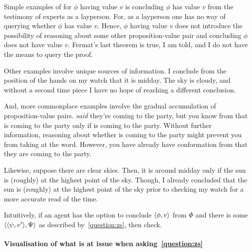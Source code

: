 \begin{note}[Success]
  Simple examples of \csV{} for \(\phi\) having value \(v\) is concluding \(\phi\) has value \(v\) from the testimony of experts as a layperson.
  For, as a layperson one has no way of querying whether \(\phi\) has value \(v\).
  Hence, \(\phi\) having value \(v\) does not introduce the possibility of reasoning about some other proposition-value pair and concluding \(\phi\) does not have value \(v\).
  Fermat's last theorem is true, I am told, and I do not have the means to query the proof.

  Other examples involve unique sources of information.
  I conclude from the position of the hands on my watch that it is midday.
  The sky is cloudy, and without a second time piece I have no hope of reaching a different conclusion.

  And, more commonplace examples involve the gradual accumulation of proposition-value pairs.
   \emph{said} they're coming to the party, but you know from  that  is coming to the party only if  is coming to the party.
  Without further information, reasoning about whether  is coming to the party might prevent you from taking  at the word.
  However, you have already have conformation from  that they are coming to the party.

  Likewise, suppose there are clear skies.
  Then, it is around midday only if the sun is (roughly) at the highest point of the sky.
  Though, I already concluded that the sun is (roughly) at the highest point of the sky prior to checking my watch for a more accurate read of the time.
\end{note}

\begin{note}
  Intuitively, if an agent has the option to conclude \(\langle \phi, v \rangle\) from \(\Phi\) and there is some \(\langle \langle \psi, v' \rangle, \Psi \rangle\) as described by~\autoref{question:zs}, then check.
\end{note}

\paragraph*{Visualisation of what is at issue when asking~\autoref{question:zs}}

